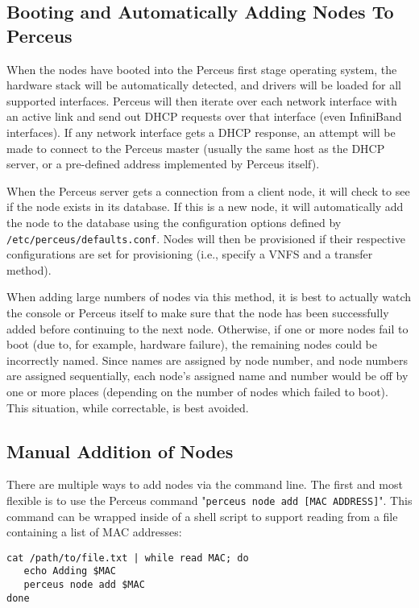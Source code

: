 \documentclass[10pt,letterpaper]{report}
\begin{document}
\subsection{Booting and Automatically Adding Nodes To Perceus}

When the nodes have booted into the Perceus first stage operating system, the
hardware stack will be automatically detected, and drivers will be loaded for
all supported interfaces.  Perceus will then iterate over each network
interface with an active link and send out DHCP requests over that interface
(even InfiniBand interfaces).  If any network interface gets a DHCP response,
an attempt will be made to connect to the Perceus master (usually the same
host as the DHCP server, or a pre-defined address implemented by Perceus
itself).

When the Perceus server gets a connection from a client node, it will check to
see if the node exists in its database. If this is a new node, it will automatically
add the node to the database using the configuration options defined
by {\tt /etc/perceus/defaults.conf}.  Nodes will then be provisioned if their
respective configurations are set for provisioning (i.e., specify a VNFS and a
transfer method).

When adding large numbers of nodes via this method, it is best to actually
watch the console or Perceus itself to make sure that the node has been
successfully added before continuing to the next node.  Otherwise, if one
or more nodes fail to boot (due to, for example, hardware failure), the remaining nodes could
be incorrectly named.  Since names are assigned by node number, and node
numbers are assigned sequentially, each node's assigned name and number would
be off by one or more places (depending on the number of nodes which failed to
boot).  This situation, while correctable, is best avoided.

\subsection{Manual Addition of Nodes}

There are multiple ways to add nodes via the command line.  The first and most
flexible is to use the Perceus command "{\tt perceus node add [MAC ADDRESS]}".
This command can be wrapped inside of a shell script to support reading from a
file containing a list of MAC addresses:

\begin{verbatim}
cat /path/to/file.txt | while read MAC; do
   echo Adding $MAC
   perceus node add $MAC
done
\end{verbatim}
\end{document}
